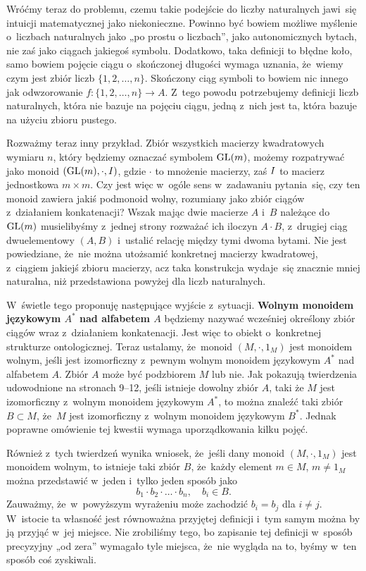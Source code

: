 \documentclass[a4paper,11pt]{article}
\begin{document}
Wróćmy teraz do problemu, czemu takie podejście do liczby naturalnych
jawi~się intuicji matematycznej jako niekonieczne. Powinno być bowiem
możliwe myślenie o~liczbach naturalnych jako „po prostu o liczbach”, jako
autonomicznych bytach, nie zaś jako ciągach jakiegoś symbolu. Dodatkowo,
taka definicji to błędne koło, samo bowiem pojęcie ciągu o~skończonej
długości wymaga uznania, że~wiemy czym jest zbiór liczb $\{ 1, 2, \ldots, n \}$.
Skończony ciąg symboli to bowiem nic innego jak odwzorowanie
$f : \{ 1, 2, \ldots, n \} \to A$. Z~tego powodu potrzebujemy definicji liczb
naturalnych, która nie bazuje na pojęciu ciągu, jedną z~nich jest ta, która
bazuje na użyciu zbioru pustego.

Rozważmy teraz inny przykład. Zbiór wszystkich macierzy kwadratowych wymiaru
$n$, który będziemy oznaczać symbolem $\mathrm{GL}( m )$, możemy rozpatrywać jako
monoid $( \mathrm{GL}( m ), \cdot, I )$, gdzie $\cdot$ to mnożenie macierzy, zaś
$I$ to macierz jednostkowa $m \times m$. Czy jest więc w~ogóle sens
w~zadawaniu pytania~się, czy ten monoid zawiera jakiś podmonoid wolny,
rozumiany jako zbiór ciągów z~działaniem konkatenacji? Wszak mając dwie
macierze $A$ i~$B$ należące do $\mathrm{GL}( m )$ musielibyśmy z~jednej strony
rozważać ich iloczyn $A \cdot B$, z~drugiej ciąg dwuelementowy $( A, B )$
i~ustalić relację między tymi dwoma bytami. Nie jest powiedziane, że~nie
można utożsamić konkretnej macierzy kwadratowej, z~ciągiem jakiejś zbioru
macierzy, acz taka konstrukcja wydaje~się znacznie mniej naturalna, niż
przedstawiona powyżej dla liczb naturalnych.

W~świetle tego proponuję następujące wyjście z~sytuacji. \textbf{Wolnym
  monoidem językowym $A^{ * }$ nad alfabetem $A$} będziemy nazywać wcześniej
określony zbiór ciągów wraz z~działaniem konkatenacji. Jest więc to obiekt
o~konkretnej strukturze ontologicznej. Teraz ustalamy, że~monoid
$( M, \cdot, 1_{ M } )$ jest monoidem wolnym, jeśli jest izomorficzny z~pewnym
wolnym monoidem językowym $A^{ * }$ nad alfabetem $A$. Zbiór $A$ może być
podzbiorem $M$ lub nie. Jak pokazują twierdzenia udowodnione na stronach
9--12, jeśli istnieje dowolny zbiór $A$, taki że $M$ jest izomorficzny
z~wolnym monoidem językowym $A^{ * }$, to można znaleźć taki zbiór $B \subset M$,
że~$M$ jest izomorficzny z~wolnym monoidem językowym $B^{ * }$. Jednak
poprawne omówienie tej kwestii wymaga uporządkowania kilku pojęć.

Również z~tych twierdzeń wynika wniosek, że~jeśli dany monoid
$( M, \cdot, 1_{ M } )$ jest monoidem wolnym, to istnieje taki zbiór $B$,
że~każdy element $m \in M$, $m \neq 1_{ M }$ można przedstawić w~jeden i~tylko
jeden sposób jako
\begin{equation}
  \label{eq:Forys-Forys-04}
  b_{ 1 } \cdot b_{ 2 } \cdot \ldots \cdot b_{ n }, \quad
  b_{ i } \in B.
\end{equation}
Zauważmy, że~w~powyższym wyrażeniu może zachodzić $b_{ i } = b_{ j }$ dla
$i \neq j$. W~istocie ta własność jest równoważna przyjętej definicji i~tym
samym można by ją przyjąć w~jej miejsce. Nie zrobiliśmy tego, bo zapisanie
tej definicji w~sposób precyzyjny „od zera” wymagało tyle miejsca, że~nie
wygląda na to, byśmy w~ten sposób coś zyskiwali.
\end{document}
